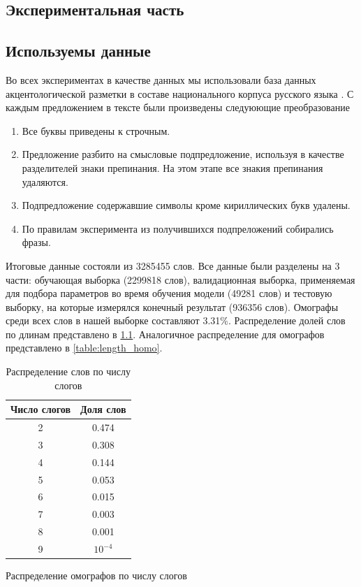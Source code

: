 \documentclass[14pt, a4paper, russian]{report}
\begin{document}
\begin{normalsize}
\newpage
\chapter{Экспериментальная часть}
\section{Используемы данные}
\label{prepare}
Во всех экспериментах в качестве данных мы использовали база данных акцентологической разметки в составе национального корпуса русского языка \cite{grishina}. С каждым предложением в тексте были произведены следуюющие преобразование
\begin{enumerate}
	\item Все буквы приведены к строчным.
	\item Предложение разбито на смысловые подпредложение, используя в качестве разделителей знаки препинания. На этом этапе все знакия препинания удаляются.
	\item Подпредложение содержавшие символы кроме кириллических букв удалены.
	\item По правилам эксперимента из получившихся подпреложений собирались фразы.
\end{enumerate}
Итоговые данные состояли из 3285455  слов. Все данные были разделены на 3 части: обучающая выборка (2299818 слов), валидационная выборка, применяемая для подбора параметров во время обучения модели (49281 слов) и тестовую  выборку, на которые измерялся конечный результат (936356 слов).
Омографы среди всех слов в нашей выборке составляют 3.31\%. Распределение долей слов по длинам представлено в \cref{table:length_gen}. Аналогичное распределение для омографов представлено в \cref{table:length_homo}.

\begin{table}[H]
	\caption{Распределение слов по числу слогов}
	
	\begin{small}
		\begin{center}
			\begin{tabular}{|c|c|}
				\hline
				Число слогов & Доля слов \\ \hline
				     2       &   0.474   \\ \hline
				     3       &   0.308   \\ \hline
				     4       &   0.144   \\ \hline
				     5       &   0.053   \\ \hline
				     6       &   0.015   \\ \hline
				     7       &   0.003   \\ \hline
				     8       &   0.001   \\ \hline
				     9       & $10^{-4}$ \\ \hline
			\end{tabular}
			\end{center}
		\end{small}
	\label{table:length_gen}
\end{table}	
\begin{table}[H]
	\caption{Распределение омографов по числу слогов}
	

\end{table}
\end{normalsize}
\end{document}
